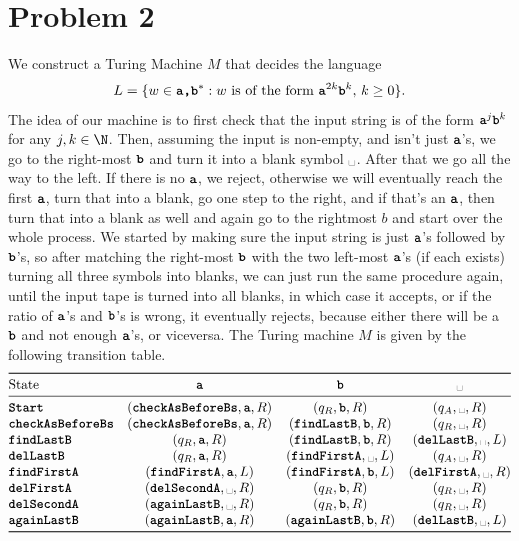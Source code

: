 \documentclass[11pt,a4paper]{article}
\newcommand{\bl}{\ensuremath{\text{\textvisiblespace}}}
\newcommand{\word}[1]{\text{\textbf{\texttt{#1}}}}
\begin{document}
\section*{Problem 2}
We construct a Turing Machine $M$ that decides the language $$L = \{ w \in
\word{a,b}^{*}  : w \text{ is of the form } \word{a}^{2k}\word{b}^{k}, \,
k \geq 0 \}.$$ The idea of our machine is to first check that the input string
is of the form  $\word{a}^{j}\word{b}^{k}$ for any $j,k \in \N$. Then,
assuming the input is non-empty, and isn't just $\word{a}$'s, we go to the
right-most $\word{b}$ and turn it into a blank symbol $\bl$. After that we
go all the way to the left. If there is no $\word{a}$, we reject, otherwise
we will eventually reach the first $\word{a}$, turn that into a blank, go one
step to the right, and if that's an $\word{a}$, then turn that into a blank
as well and again go to the rightmost $b$ and start over the whole process.
We started by making sure the input string is just $\word{a}$'s
followed by $\word{b}$'s, so after matching the right-most $\word{b}$ with the two left-most $\word{a}$'s (if each exists) turning all three symbols into blanks, we can just run the same procedure again, until the input tape is turned into all blanks, in which case it accepts, or if the ratio of  $\word{a}$'s and $\word{b}$'s is wrong, it eventually rejects, because either there will be a $\word{b}$ and not enough $\word{a}$'s, or viceversa. The Turing machine $M$ is given by the following transition table. 
\[
\begin{array}{@{}lccc@{}}
\toprule
\text{State} & \word{a} & \word{b} & \bl \\
\midrule
\word{Start} & (\word{checkAsBeforeBs},\word{a},R) & (q_R,\word{b},R) & (q_A,\bl,R)\\
\word{checkAsBeforeBs} & (\word{checkAsBeforeBs}, \word{a},R ) & (\word{findLastB}, \word{b}, R) & (q_R, \bl, R) \\
\word{findLastB} & (q_R, \word{a}, R) & (\word{findLastB},\word{b},R) & (\word{delLastB}, \bl, L) \\ 
\word{delLastB} & (q_R, \word{a}, R) & (\word{findFirstA}, \bl, L) & (q_A, \bl, R) \\
\word{findFirstA} & (\word{findFirstA}, \word{a}, L) & (\word{findFirstA}, \word{b}, L) & (\word{delFirstA}, \bl, R) \\
\word{delFirstA} & (\word{delSecondA}, \bl, R) & (q_R, \word{b}, R) & (q_R, \bl, R) \\
\word{delSecondA} & (\word{againLastB}, \bl, R) & (q_R, \word{b}, R) & (q_R, \bl, R) \\
\word{againLastB} & (\word{againLastB}, \word{a}, R) & (\word{againLastB}, \word{b}, R) & (\word{delLastB}, \bl, L) \\
\bottomrule
\end{array}
\]
\end{document}
